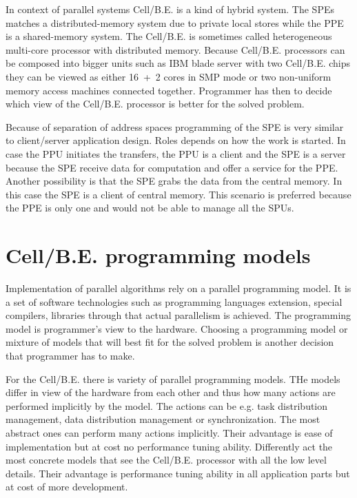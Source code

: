 In context of parallel systems \mbox{Cell/B.E.} is a kind of hybrid system.
The SPEs matches a distributed-memory system due to private local stores while the PPE is a shared-memory system.
The \mbox{Cell/B.E.} is sometimes called heterogeneous multi-core processor with distributed memory.
Because \mbox{Cell/B.E.} processors can be composed into bigger units such as IBM blade server with two \mbox{Cell/B.E.} chips they can be viewed as either \mbox{16 + 2} cores in SMP mode or two non-uniform memory access machines connected together.
Programmer has then to decide which view of the \mbox{Cell/B.E.} processor is better for the solved problem.

\par
Because of separation of address spaces programming of the SPE is very similar to client/server application design.
Roles depends on how the work is started.
In case the PPU initiates the transfers, the PPU is a client and the SPE is a server because the SPE receive data for computation and offer a service for the PPE.
Another possibility is that the SPE grabs the data from the central memory.
In this case the SPE is a client of central memory.
This scenario is preferred because the PPE is only one and would not be able to manage all the SPUs.

\section{\mbox{Cell/B.E.} programming models}

\par
Implementation of parallel algorithms rely on a parallel programming model.
It is a set of software technologies such as programming languages extension, special compilers, libraries through that actual parallelism is achieved.
The programming model is programmer's view to the hardware.
Choosing a programming model or mixture of models that will best fit for the solved problem is another decision that programmer has to make.

\par
For the \mbox{Cell/B.E.} there is variety of parallel programming models.
THe models differ in view of the hardware from each other and thus how many actions are performed implicitly by the model.
The actions can be e.g. task distribution management, data distribution management or synchronization.
The most abstract ones can perform many actions implicitly.
Their advantage is ease of implementation but at cost no performance tuning ability.
Differently act the most concrete models that see the \mbox{Cell/B.E.} processor with all the low level details.
Their advantage is performance tuning ability in all application parts but at cost of more development.

